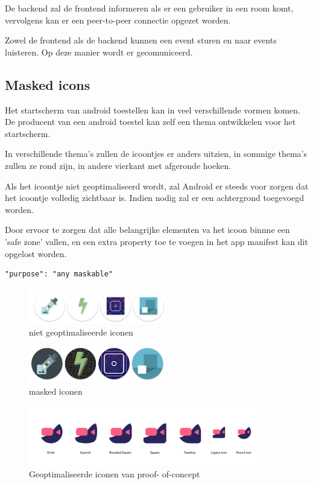 		De backend zal de frontend informeren als er een gebruiker in een room komt, vervolgens kan er een peer-to-peer connectie opgezet worden.
		
		Zowel de frontend als de backend kunnen een event sturen en naar events luisteren. Op deze manier wordt er gecomuniceerd. 	
		
			
	\subsection{Masked icons}
	
		Het startscherm van android toestellen kan in veel verschillende vormen komen. De producent van een android toestel kan zelf een thema ontwikkelen voor het startscherm.
		
		In verschillende thema's zullen de icoontjes er anders uitzien, in sommige thema's zullen ze rond zijn, in andere vierkant met afgeronde hoeken. 
		
		Als het icoontje niet geoptimaliseerd wordt, zal Android er steeds voor zorgen dat het icoontje volledig zichtbaar is. Indien nodig zal er een achtergrond toegevoegd worden.
		
		Door ervoor te zorgen dat alle belangrijke elementen va het icoon binnne een 'safe zone' vallen, en een extra property toe te voegen in het app manifest kan dit opgelost worden.
		
\begin{lstlisting}
"purpose": "any maskable" 
\end{lstlisting}

		\begin{figure}[H]
			\centering
			\includegraphics[width=60mm]{./img/traditionalIcons}{}
			\caption{niet geoptimaliseerde iconen}
		\end{figure}
		\begin{figure}[H]
			\centering
			\includegraphics[width=60mm]{./img/maskedicons}{}
			\caption{masked iconen}
		\end{figure}
		\begin{figure}[H]
			\centering
			\includegraphics[width=100mm]{./img/iconPWA.png}{}
			\caption{Geoptimaliseerde iconen van proof- of-concept}
		\end{figure}


